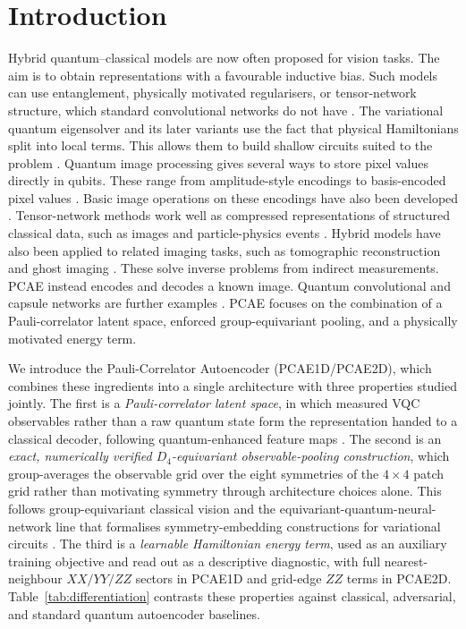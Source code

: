 \documentclass[pdflatex,sn-basic]{sn-jnl}
\begin{document}
\tableofcontents

\section{Introduction}
\label{sec:intro}

Hybrid quantum--classical models are now often proposed for vision tasks.
The aim is to obtain representations with a favourable inductive bias.
Such models can use entanglement, physically motivated regularisers, or tensor-network structure, which standard convolutional networks do not have \citep{Cerezo2021, Tilly2022, Preskill2018}.
The variational quantum eigensolver and its later variants use the fact that physical Hamiltonians split into local terms.
This allows them to build shallow circuits suited to the problem \citep{Cerezo2021, Tilly2022, Bauer2020}.
Quantum image processing gives several ways to store pixel values directly in qubits.
These range from amplitude-style encodings \citep{Le2011} to basis-encoded pixel values \citep{Zhang2013}.
Basic image operations on these encodings have also been developed \citep{Chakraborty2018, Zhou2017, Yao2017}.
Tensor-network methods work well as compressed representations of structured classical data, such as images \citep{Cirac2021, Latorre2005, Han2018, Stoudenmire2016, Ran2020TNCS, Guala2023} and particle-physics events \citep{Araz2022}.
Hybrid models have also been applied to related imaging tasks, such as tomographic reconstruction \citep{Haga2024, Nau2023} and ghost imaging \citep{Zhai2025}.
These solve inverse problems from indirect measurements.
PCAE instead encodes and decodes a known image.
Quantum convolutional and capsule networks are further examples \citep{Slabbert2024, Cong2019, Hur2022, Liu2022}.
PCAE focuses on the combination of a Pauli-correlator latent space, enforced group-equivariant pooling, and a physically motivated energy term.

We introduce the Pauli-Correlator Autoencoder (PCAE1D/PCAE2D), which combines these ingredients into a single architecture with three properties studied jointly.
The first is a \emph{Pauli-correlator latent space}, in which measured VQC observables rather than a raw quantum state form the representation handed to a classical decoder, following quantum-enhanced feature maps \citep{Havlicek2019}.
The second is an \emph{exact, numerically verified $D_4$-equivariant observable-pooling construction}, which group-averages the observable grid over the eight symmetries of the $4\times4$ patch grid rather than motivating symmetry through architecture choices alone.
This follows group-equivariant classical vision \citep{Cohen2016, Bronstein2021} and the equivariant-quantum-neural-network line that formalises symmetry-embedding constructions for variational circuits \citep{Meyer2023, Nguyen2024EQNN, Schatzki2024, West2024, West2024Erratum}.
The third is a \emph{learnable Hamiltonian energy term}, used as an auxiliary training objective and read out as a descriptive diagnostic, with full nearest-neighbour $XX/YY/ZZ$ sectors in PCAE1D and grid-edge $ZZ$ terms in PCAE2D.
Table~\ref{tab:differentiation} contrasts these properties against classical, adversarial, and standard quantum autoencoder baselines.
\end{document}
